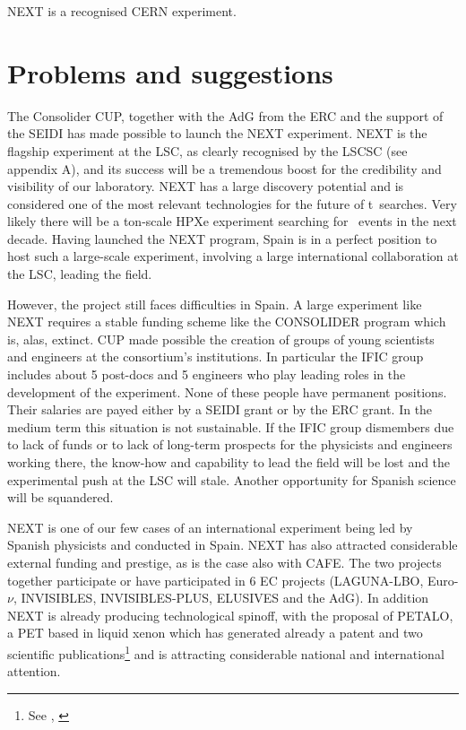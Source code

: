 \documentclass[a4paper,11pt,oneside]{article}
\begin{document}
NEXT is a recognised CERN experiment. 


\section{\bf \textsf{Problems and suggestions}}

\label{sec.problems}

The Consolider CUP, together with the AdG from the ERC and the support of the SEIDI has made possible to launch the NEXT experiment. NEXT is the flagship experiment at the LSC, as clearly recognised by the LSCSC (see appendix A), and its success will be a tremendous boost for the credibility and visibility of our laboratory. NEXT has a large discovery potential and is considered one of the most relevant technologies for the future of t\bbonu\ searches. Very likely there will be a ton-scale HPXe experiment searching for \bbonu\ events in the next decade. Having launched the NEXT program, Spain is in a perfect position to host such a large-scale experiment, involving a large international collaboration at the LSC, leading the field. 

However, the project still faces difficulties in Spain. A large experiment like NEXT requires a stable funding scheme like the CONSOLIDER program which is, alas, extinct. CUP made possible the creation of groups of young scientists and engineers at the consortium's institutions. In particular the IFIC group includes about 5 post-docs and 5 engineers who play leading roles in the development of the experiment. None of these people have permanent positions. Their salaries are payed either by a SEIDI grant or by the ERC grant. In the medium term this situation is not sustainable. If the IFIC group dismembers due to lack of funds or to lack of long-term prospects for the physicists and engineers working there, the know-how and capability to lead the field will be lost and the experimental push at the LSC will stale. Another opportunity for Spanish science will be squandered. 

NEXT is one of our few cases of an international experiment being led by Spanish physicists and conducted in Spain. NEXT has also attracted considerable external funding and prestige, as is the case also with CAFE. The two projects together participate or have participated in 6 EC projects (LAGUNA-LBO, Euro-$\nu$, INVISIBLES, INVISIBLES-PLUS, ELUSIVES and the AdG). 
In addition NEXT is already producing technological spinoff, with the proposal of PETALO, a PET based in liquid xenon which has generated already a patent and two scientific publications\footnote{See \cite{Petalo2015}, \cite{Gomez-Cadenas:2016mkq}} and is attracting considerable national and international attention. 
\end{document}
